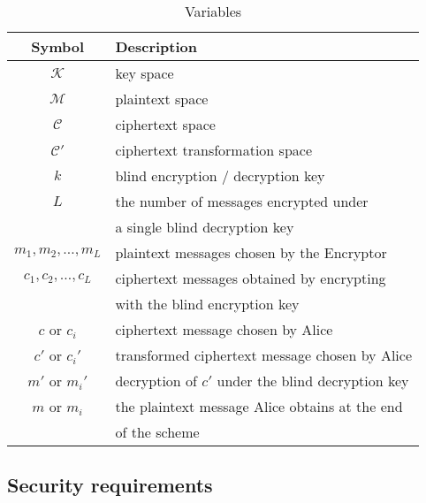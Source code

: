 \documentclass[10pt,journal]{IEEEtran}
\begin{document}
\begin{table}
\caption{Variables}
\begin{tabular}{|c|l|}
\hline
Symbol & Description\\
\hline
\hline
$\mathcal{K}$ & key space\\
$\mathcal{M}$ & plaintext space\\
$\mathcal{C}$ & ciphertext space\\
$\mathcal{C'}$ & ciphertext transformation space\\
$k$ & blind encryption / decryption key\\
$L$ & the number of messages encrypted under\\ & a single blind decryption key\\
$m_1,m_2,\ldots,m_L$ & plaintext messages chosen by the Encryptor\\
$c_1,c_2,\ldots,c_L$ & ciphertext messages obtained by encrypting \\ & with the blind encryption key\\
$c$ or $c_i$ & ciphertext message chosen by Alice\\
$c'$ or $c_i'$ & transformed ciphertext message chosen by Alice\\
$m'$ or $m_i'$ & decryption of $c'$ under the blind decryption key\\
$m$ or $m_i$ & the plaintext message Alice obtains at the end\\ & of the scheme\\
\hline
\end{tabular}
\vspace{4pt}
\label{tab:Table of symbols}
\end{table}



\subsection{Security requirements}
\end{document}
